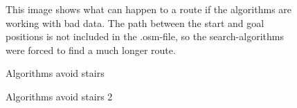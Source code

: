 \begin{figure}
	\centering
	\caption[Sup-optimal path due to bad data]{This image shows what can happen to a route if the algorithms are working with bad data. The path between the start and goal positions is not included in the .osm-file, so the search-algorithms were forced to find a much longer route.}
	\label{fig:badDataBadPath}
\end{figure}

\begin{figure}
	\centering
	\caption{Algorithms avoid stairs}
	\label{fig:avoidStairs}
\end{figure}
\begin{figure}
	\centering
	\caption{Algorithms avoid stairs 2}
	\label{fig:avoidStairs2}
\end{figure}

